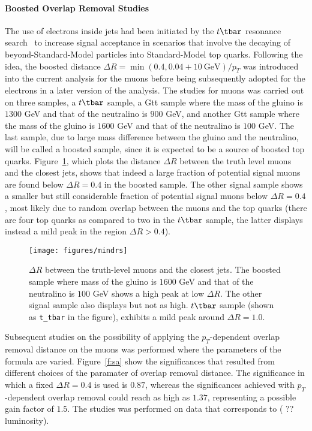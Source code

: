 \paragraph{Boosted Overlap Removal Studies} The use of electrons inside jets
had been initiated by the $t\tbar$ resonance search~\cite{ttbarres} to increase
signal acceptance in scenarios that involve the decaying of
beyond-Standard-Model particles into Standard-Model top quarks. Following the
idea, the boosted distance $\Delta R = \min(0.4, 0.04+10~\text{GeV}) / p_T$ was
introduced into the current analysis for the muons before being subsequently
adopted for the electrons in a later version of the analysis. The studies for
muons was carried out on three samples, a $t\tbar$ sample, a Gtt sample where
the mass of the gluino is $1300$ GeV and that of the neutralino is $900$ GeV,
and another Gtt sample where the mass of the gluino is $1600$ GeV and that of
the neutralino is $100$ GeV. The last sample, due to large mass difference
between the gluino and the neutralino, will be called a boosted sample, since
it is expected to be a source of boosted top quarks. Figure~\ref{f:mindrs},
which plots the distance $\Delta R$ between the truth level muons and the
closest jets, shows that indeed a large fraction of potential signal muons are
found below $\Delta R = 0.4$ in the boosted sample. The other signal sample
shows a smaller but still considerable fraction of potential signal muons below
$\Delta R = 0.4$, most likely due to random overlap between the muons and the
top quarks (there are four top quarks as compared to two in the $t\tbar$
sample, the latter displays instead a mild peak in the region $\Delta R >
	0.4$).

\begin{figure}[H]
	\texttt{[image: figures/mindrs]}
	\centering

	\caption{$\Delta R$ between the truth-level muons and the closest jets. The
		boosted sample where mass of the gluino is $1600$ GeV and that of the
		neutralino is $100$ GeV shows a high peak at low $\Delta R$. The other signal
		sample also displays but not as high. $t\tbar$ sample (shown as
		\texttt{t\_tbar} in the figure), exhibits a mild peak around $\Delta R =
			1.0$.}

	\label{f:mindrs}
\end{figure}

Subsequent studies on the possibility of applying the $p_T$-dependent overlap
removal distance on the muons was performed where the parameters of the formula
are varied. Figure~\ref{f:sa} show the significances that resulted from
different choices of the paramater of overlap removal distance. The
significance in which a fixed $\Delta R = 0.4$ is used is $0.87$, whereas the
significances achieved with $p_T$-dependent overlap removal could reach as high
as $1.37$, representing a possible gain factor of $1.5$. The studies was
performed on data that corresponds to ({\color{pink} ?? luminosity}).

